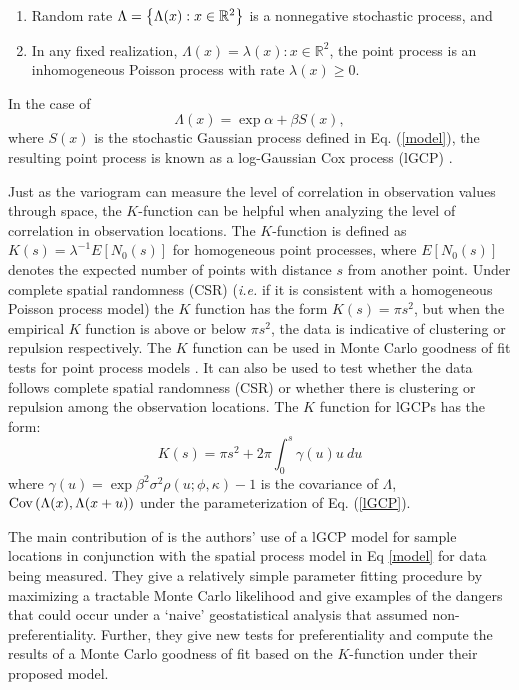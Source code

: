 \documentclass{uwstat572}
\begin{document}
\begin{enumerate}
\item Random rate $\Lambda = \left\{\Lambda(x) : x \in \mathbb{R}^2\right\}$ is a nonnegative stochastic process, and
\item In any fixed realization, $\Lambda(x) = \lambda(x) : x \in \mathbb{R}^2$, the point process is an inhomogeneous Poisson process with rate $\lambda(x) \geq 0$.
\end{enumerate}
In the case of
\begin{equation}
\Lambda(x) = \exp{\alpha + \beta S(x)},
\label{lGCP}
\end{equation}
where $S(x)$ is the stochastic Gaussian process defined in Eq. (\ref{model}), the resulting point process is known as a log-Gaussian Cox process (lGCP) \citep{diggle2010}.
\par
Just as the variogram can measure the level of correlation in observation values through space, the $K$-function can be helpful when analyzing the level of correlation in observation locations.  The $K$-function is defined as $K(s) = \lambda^{-1} E[N_0(s)]$ for homogeneous point processes, where $E[N_0(s)]$ denotes the expected number of points with distance $s$ from another point.  Under complete spatial randomness (CSR) (\emph{i.e.} if it is consistent with a homogeneous Poisson process model) the $K$ function has the form $K(s) = \pi s^2$, but when the empirical $K$ function is above or below $\pi s^2$, the data is indicative of clustering or repulsion respectively.  The $K$ function can be used in Monte Carlo goodness of fit tests for point process models \citep[Section 18.3]{handbook}.  It can also be used to test whether the data follows complete spatial randomness (CSR) or whether there is clustering or repulsion among the observation locations.  The $K$ function for lGCPs has the form:
\begin{equation}
K(s) = \pi s^2 + 2 \pi \int_0^s \gamma(u) u \ du
\label{Kfun}
\end{equation}
where $\gamma(u) = \exp{\beta^2 \sigma^2 \rho(u ; \phi, \kappa)} - 1$ is the covariance of $\Lambda$, $\text{Cov}\left(\Lambda(x), \Lambda(x + u)\right)$ under the parameterization of Eq. (\ref{lGCP}).
\par
The main contribution of \citet{diggle2010} is the authors' use of a lGCP model for sample locations in conjunction with the spatial process model in Eq \ref{model} for data being measured.  They give a relatively simple parameter fitting procedure by maximizing a tractable Monte Carlo likelihood and give examples of the dangers that could occur under a `naive' geostatistical analysis that assumed non-preferentiality.  Further, they give new tests for preferentiality and compute the results of a Monte Carlo goodness of fit based on the $K$-function under their proposed model.

%

\end{document}
